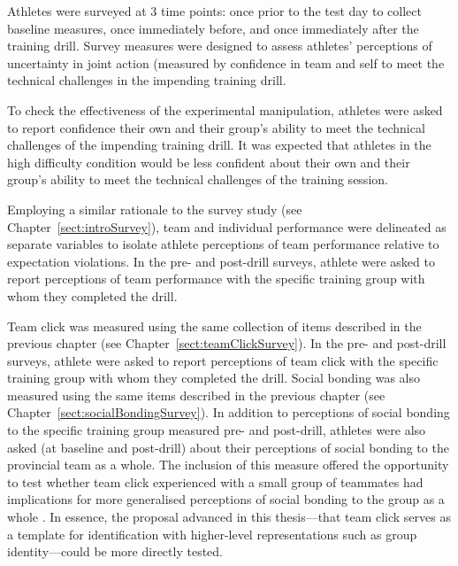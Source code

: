 \begin{CJK}{UTF8}{gbsn}
Athletes were surveyed at 3 time points: once prior to the test day to collect baseline measures, once immediately before, and once immediately after the training drill.  Survey measures were designed to assess athletes’ perceptions of uncertainty in joint action (measured by confidence in team and self to meet the technical challenges in the impending training drill.

To check the effectiveness of the experimental manipulation, athletes were asked to report confidence their own and their group's ability to meet the technical challenges of the impending training drill.  It was expected that athletes in the high difficulty condition would be less confident about their own and their group's ability to meet the technical challenges of the training session.

Employing a similar rationale to the survey study (see Chapter~\ref{sect:introSurvey}), team and individual performance were delineated as separate variables   to isolate athlete perceptions of team performance relative to expectation violations.  In the pre- and post-drill surveys, athlete were asked to report perceptions of team performance with the specific training group with whom they completed the drill.

Team click was measured using the same collection of items described in the previous chapter (see Chapter~\ref{sect:teamClickSurvey}).  In the pre- and post-drill surveys, athlete were asked to report perceptions of team click with the specific training group with whom they completed the drill.  Social bonding was also measured using the same items described in the previous chapter (see Chapter~\ref{sect:socialBondingSurvey}).  In addition to perceptions of social bonding to the specific training group measured pre- and post-drill, athletes were also asked (at baseline and post-drill) about their perceptions of social bonding to the provincial team as a whole.  The inclusion of this measure offered the opportunity to test whether team click experienced with a small group of teammates had implications for more generalised perceptions of social bonding to the group as a whole \citep[see, for example][]{Reddish2013a,Swann2010}.  In essence, the proposal advanced in this thesis---that team click serves as a template for identification with higher-level representations such as group identity---could be more directly tested.


\end{CJK}
